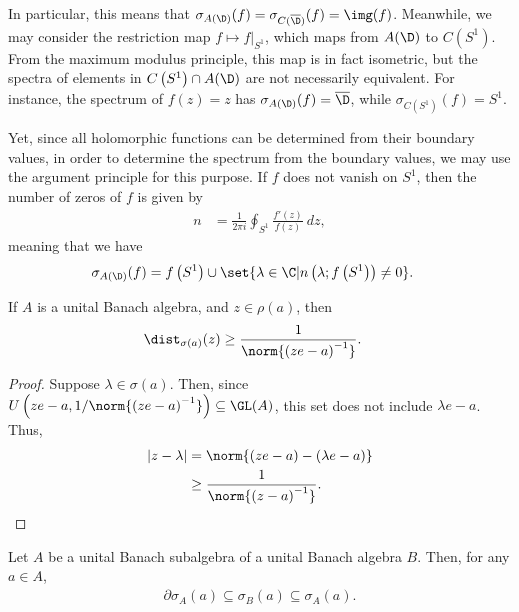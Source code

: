 \documentclass[10pt]{mypackage}
\begin{document}
In particular, this means that $\sigma_{A(\D)}(f) = \sigma_{C(\overline{\D})}(f) = \img(f)$. Meanwhile, we may consider the restriction map $f\mapsto f|_{S^{1}}$, which maps from $A(\D)$ to $C\left(S^{1}\right)$. From the maximum modulus principle, this map is in fact isometric, but the spectra of elements in $C\left( S^{1} \right)\cap A(\D)$ are not necessarily equivalent. For instance, the spectrum of $f(z) = z$ has $\sigma_{A(\D)}(f) = \overline{\D}$, while $\sigma_{C\left(S^{1}\right)}(f) = S^{1}$.

Yet, since all holomorphic functions can be determined from their boundary values, in order to determine the spectrum from the boundary values, we may use the argument principle for this purpose. If $f$ does not vanish on $S^{1}$, then the number of zeros of $f$ is given by
\begin{align*}
  n &= \frac{1}{2\pi i} \oint_{S^{1}}^{} \frac{f'(z)}{f(z)}\:dz,
\end{align*}
meaning that we have
\begin{align*}
  \sigma_{A(\D)}(f) &= f\left( S^{1} \right) \cup \set{\lambda\in \C | n\left( \lambda;f\left(S^{1}\right) \right)\neq 0}.
\end{align*}
\begin{proposition}
  If $A$ is a unital Banach algebra, and $z\in \rho(a)$, then
  \begin{align*}
    \dist_{\sigma(a)}(z) &\geq \frac{1}{\norm{\left( ze -a \right)^{-1}}}.
  \end{align*}
\end{proposition}
\begin{proof}
  Suppose $\lambda\in \sigma(a)$. Then, since $U\left( ze-a,1/\norm{\left( ze-a \right)^{-1}} \right)\subseteq \GL(A)$, this set does not include $\lambda e - a$. Thus,
  \begin{align*}
    \left\vert z-\lambda \right\vert &= \norm{\left( ze-a \right)-\left( \lambda e - a \right)}\\
                                     &\geq \frac{1}{\norm{\left( z-a \right)^{-1}}}.
  \end{align*}
\end{proof}
\begin{proposition}
  Let $A$ be a unital Banach subalgebra of a unital Banach algebra $B$. Then, for any $a\in A$,
  \begin{align*}
    \partial \sigma_{A}(a) \subseteq \sigma_B(a)\subseteq \sigma_A(a).
  \end{align*}
\end{proposition}
\end{document}
